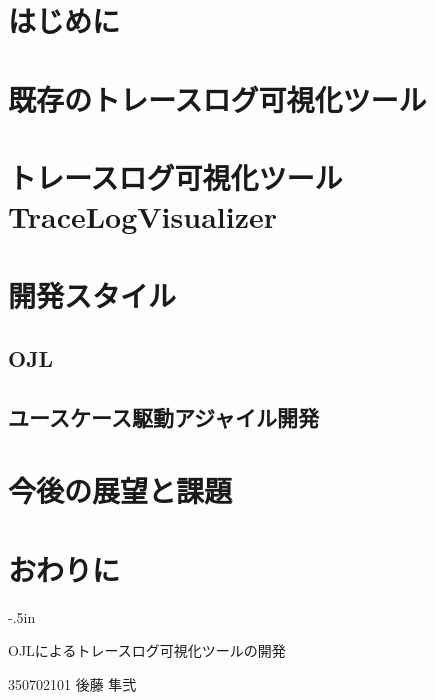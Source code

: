 \documentclass[a4paper,12pt]{jreport}
\begin{document}
\chapter{はじめに}

\chapter{既存のトレースログ可視化ツール}

\chapter{トレースログ可視化ツールTraceLogVisualizer}

\chapter{開発スタイル}
\section{OJL}
\section{ユースケース駆動アジャイル開発}

\chapter{今後の展望と課題}

\chapter{おわりに}

\clearpage

\thispagestyle{empty}
\oddsidemargin -4in
\evensidemargin -4in
\topmargin -.5in
{
\tate
\Large\sffamily\gtfamily
\begin{minipage}{9.5in}
\begin{minipage}{6.0in}
OJLによるトレースログ可視化ツールの開発
\end{minipage}
\hfill\hfill\hfill\hfill
350702101
\hfill
後藤 隼弐
\end{minipage}
}
\end{document}
